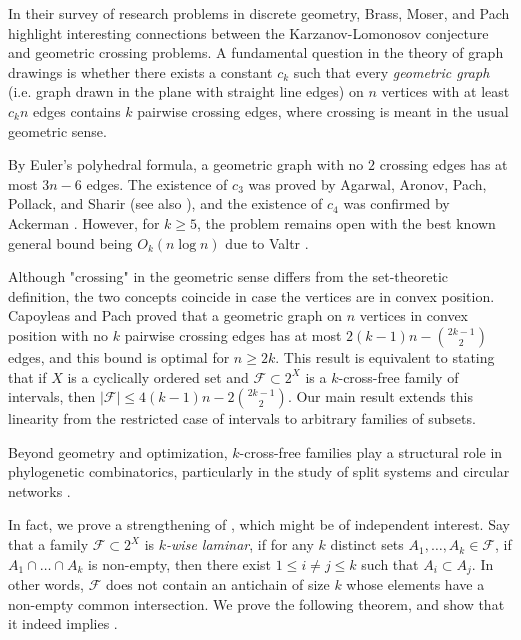 \documentclass[11pt]{article}
\theoremstyle{definition}
\newcommand{\cF}{\mathcal{F}}
\begin{document}
In their survey of research problems in discrete geometry, Brass, Moser, and Pach \cite{BMP} highlight interesting connections between the Karzanov-Lomonosov conjecture and geometric crossing problems. A fundamental question in the theory of graph drawings is whether there exists a constant $c_k$ such that every \emph{geometric graph} (i.e. graph drawn in the plane with straight line edges) on $n$ vertices with at least $c_k n$ edges contains $k$ pairwise crossing edges, where crossing is meant in the usual geometric sense.

By Euler’s polyhedral formula, a geometric graph with no $2$ crossing edges has at most $3n-6$ edges. The existence of $c_3$ was proved by Agarwal, Aronov, Pach, Pollack, and Sharir \cite{AAPPS} (see also \cite{AT,PRT}), and the existence of $c_4$ was confirmed by Ackerman \cite{Ackerman}. However, for $k\geq 5$, the problem remains open with the best known general bound being $O_k(n \log n)$ due to Valtr \cite{Valtr}.

Although "crossing" in the geometric sense differs from the set-theoretic definition, the two concepts coincide in case the vertices are in convex position. Capoyleas and Pach \cite{CP} proved that a geometric graph on $n$ vertices in convex position with no $k$ pairwise crossing edges has at most $2(k-1)n - \binom{2k-1}{2}$ edges, and this bound is optimal for $n\geq 2k$. This result is equivalent to stating that if $X$ is a cyclically ordered set and $\cF \subset 2^X$ is a $k$-cross-free family of intervals, then $|\cF| \leq 4(k-1)n - 2\binom{2k-1}{2}$. Our main result extends this linearity from the restricted case of intervals to arbitrary families of subsets.

Beyond geometry and optimization, $k$-cross-free families play a structural role in phylogenetic combinatorics, particularly in the study of split systems and circular networks \cite{DHKMS}. 

\medskip

In fact, we prove a strengthening of , which might be of independent interest. Say that a family $\mathcal{F}\subset 2^X$ is \emph{$k$-wise laminar}, if for any $k$ distinct sets $A_1,\dots,A_k\in \mathcal{F}$, if $A_1\cap\dots\cap A_k$ is non-empty, then there exist $1\leq i\neq j\leq k$ such that $A_i\subset A_j$. In other words, $\cF$ does not contain an antichain of size $k$ whose elements have a non-empty common intersection. We prove the following theorem, and show that it indeed implies .
\end{document}
